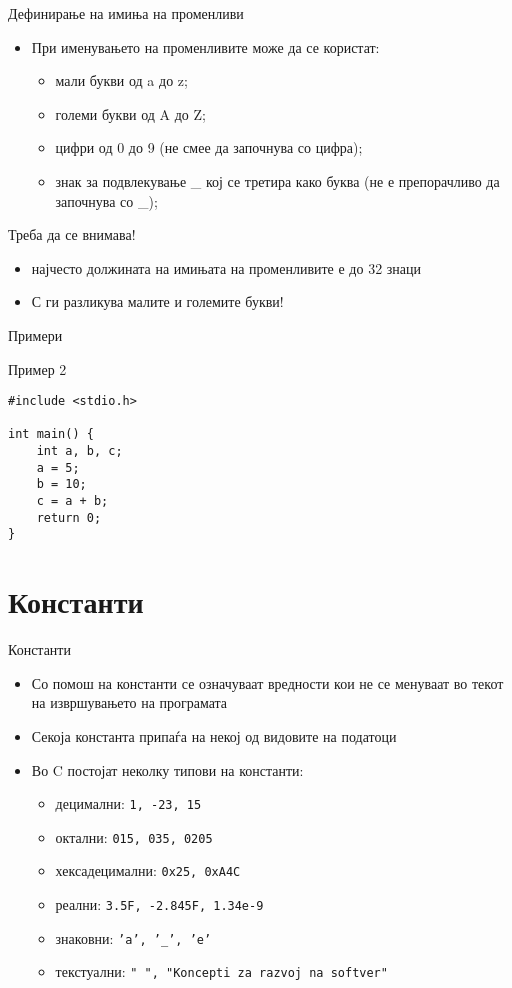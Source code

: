 \begin{frame}{Дефинирање на имиња на променливи}
\begin{itemize}
\item При именувањето на променливите може да се користат:
\begin{itemize}
\item мали букви од a до z;
\item големи букви од A до Z;
\item цифри од 0 до 9 (не смее да започнува со цифра);
\item знак за подвлекување \_ кој се третира како буква (не е препорачливо да започнува со \_);
\end{itemize}
\end{itemize}
\begin{alertblock}{Треба да се внимава!}
\begin{itemize}
\item најчесто должината на имињата на променливите е до 32 знаци
\item С ги разликува малите и големите букви!
\end{itemize}
\end{alertblock}
\end{frame}

\begin{frame}[fragile]{Примери}
    \begin{exampleblock}{Пример 2}
\begin{lstlisting}
#include <stdio.h>

int main() {
    int a, b, c;
    a = 5;
    b = 10;
    c = a + b;
    return 0;
}
\end{lstlisting}
    \end{exampleblock}
\end{frame}

\section{Константи}

\begin{frame}{Константи}
\begin{itemize}
\item Со помош на константи се означуваат вредности кои не се менуваат во текот на извршувањето на програмата
\item Секоја константа припаѓа на некој од видовите на податоци
\item Во C постојат неколку типови на константи:
\begin{itemize}
\item децимални: \texttt{1, -23, 15}
\item октални: \texttt{015, 035, 0205}
\item хексадецимални: \texttt{0x25, 0xA4C}
\item реални: \texttt{3.5F, -2.845F, 1.34e-9}
\item знаковни: \texttt{'a', '\_', 'e'}
\item текстуални: \texttt{" ", "Koncepti za razvoj na softver"}
\end{itemize}
\end{itemize}
\end{frame}

